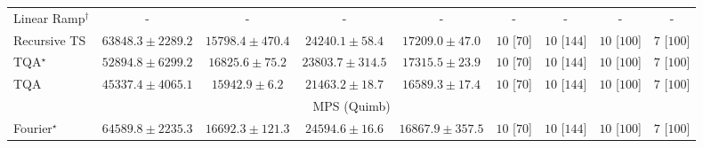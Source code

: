 \begin{tabular}{l|cccc|cccc|}
Linear Ramp$^\dagger$ & {\cellcolor[HTML]{000000}} \color[HTML]{F1F1F1} {\cellcolor{white}} \color{black} - & {\cellcolor[HTML]{000000}} \color[HTML]{F1F1F1} {\cellcolor{white}} \color{black} - & {\cellcolor[HTML]{000000}} \color[HTML]{F1F1F1} {\cellcolor{white}} \color{black} - & {\cellcolor[HTML]{000000}} \color[HTML]{F1F1F1} {\cellcolor{white}} \color{black} - & {\cellcolor[HTML]{000000}} \color[HTML]{F1F1F1} {\cellcolor{white}} \color{black} - & {\cellcolor[HTML]{000000}} \color[HTML]{F1F1F1} {\cellcolor{white}} \color{black} - & {\cellcolor[HTML]{000000}} \color[HTML]{F1F1F1} {\cellcolor{white}} \color{black} - & {\cellcolor[HTML]{000000}} \color[HTML]{F1F1F1} {\cellcolor{white}} \color{black} - \\
Recursive TS & {\cellcolor[HTML]{831A83}} \color[HTML]{F1F1F1} $63848.3\pm 2289.2$ & {\cellcolor[HTML]{F3F9FB}} \color[HTML]{000000} $15798.4\pm 470.4$ & {\cellcolor[HTML]{D6E4F0}} \color[HTML]{000000} $24240.1\pm 58.4$ & {\cellcolor[HTML]{EEF6FA}} \color[HTML]{000000} $17209.0\pm 47.0$ & {\cellcolor[HTML]{49006A}} \color[HTML]{F1F1F1} $10$ [$70$] & {\cellcolor[HTML]{49006A}} \color[HTML]{F1F1F1} $10$ [$144$] & {\cellcolor[HTML]{49006A}} \color[HTML]{F1F1F1} $10$ [$100$] & {\cellcolor[HTML]{CD238F}} \color[HTML]{F1F1F1} $7$ [$100$] \\
TQA$^\star$ & {\cellcolor[HTML]{8B60AC}} \color[HTML]{F1F1F1} $52894.8\pm 6299.2$ & {\cellcolor[HTML]{F0F7FA}} \color[HTML]{000000} $16825.6\pm 75.2$ & {\cellcolor[HTML]{D7E5F0}} \color[HTML]{000000} $23803.7\pm 314.5$ & {\cellcolor[HTML]{EEF6FA}} \color[HTML]{000000} $17315.5\pm 23.9$ & {\cellcolor[HTML]{49006A}} \color[HTML]{F1F1F1} $10$ [$70$] & {\cellcolor[HTML]{49006A}} \color[HTML]{F1F1F1} $10$ [$144$] & {\cellcolor[HTML]{49006A}} \color[HTML]{F1F1F1} $10$ [$100$] & {\cellcolor[HTML]{CD238F}} \color[HTML]{F1F1F1} $7$ [$100$] \\
TQA & {\cellcolor[HTML]{8C8CC1}} \color[HTML]{F1F1F1} $45337.4\pm 4065.1$ & {\cellcolor[HTML]{F3F9FB}} \color[HTML]{000000} $15942.9\pm 6.2$ & {\cellcolor[HTML]{E1EDF5}} \color[HTML]{000000} $21463.2\pm 18.7$ & {\cellcolor[HTML]{F1F7FA}} \color[HTML]{000000} $16589.3\pm 17.4$ & {\cellcolor[HTML]{49006A}} \color[HTML]{F1F1F1} $10$ [$70$] & {\cellcolor[HTML]{49006A}} \color[HTML]{F1F1F1} $10$ [$144$] & {\cellcolor[HTML]{49006A}} \color[HTML]{F1F1F1} $10$ [$100$] & {\cellcolor[HTML]{CD238F}} \color[HTML]{F1F1F1} $7$ [$100$] \\
\cline{1-9}
\multicolumn{9}{c}{\rule{0pt}{8pt}MPS (Quimb)} \\
\midrule
Fourier$^\star$ & {\cellcolor[HTML]{A03704}} \color[HTML]{F1F1F1} $64589.8\pm 2235.3$ & {\cellcolor[HTML]{FFFCD8}} \color[HTML]{000000} $16692.3\pm 121.3$ & {\cellcolor[HTML]{FFEFAC}} \color[HTML]{000000} $24594.6\pm 16.6$ & {\cellcolor[HTML]{FFFCD8}} \color[HTML]{000000} $16867.9\pm 357.5$ & {\cellcolor[HTML]{49006A}} \color[HTML]{F1F1F1} $10$ [$70$] & {\cellcolor[HTML]{49006A}} \color[HTML]{F1F1F1} $10$ [$144$] & {\cellcolor[HTML]{49006A}} \color[HTML]{F1F1F1} $10$ [$100$] & {\cellcolor[HTML]{CD238F}} \color[HTML]{F1F1F1} $7$ [$100$] \\

\end{tabular}

